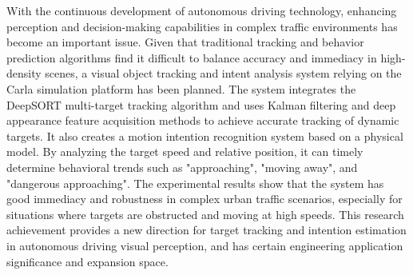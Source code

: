 \begin{abstracten}

    With the continuous development of autonomous driving technology, enhancing perception and decision-making capabilities in complex traffic environments has become an important issue. Given that traditional tracking and behavior prediction algorithms find it difficult to balance accuracy and immediacy in high-density scenes, a visual object tracking and intent analysis system relying on the Carla simulation platform has been planned. The system integrates the DeepSORT multi-target tracking algorithm and uses Kalman filtering and deep appearance feature acquisition methods to achieve accurate tracking of dynamic targets. It also creates a motion intention recognition system based on a physical model. By analyzing the target speed and relative position, it can timely determine behavioral trends such as "approaching", "moving away", and "dangerous approaching". The experimental results show that the system has good immediacy and robustness in complex urban traffic scenarios, especially for situations where targets are obstructed and moving at high speeds. This research achievement provides a new direction for target tracking and intention estimation in autonomous driving visual perception, and has certain engineering application significance and expansion space.

\end{abstracten}
